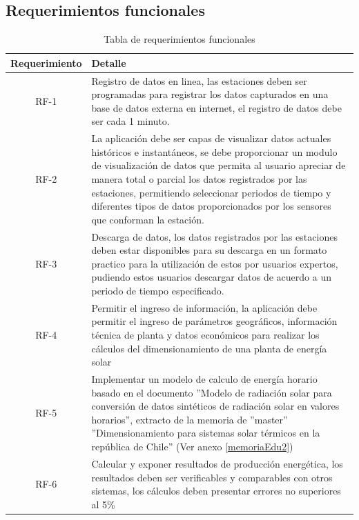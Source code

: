 \subsection{Requerimientos funcionales}
\begin{table}[h!]
\caption{Tabla de requerimientos funcionales}
\label{tablaFuncional}
\begin{tabular}{| c | p{11cm} |}
	\hline
	\textbf{Requerimiento}	&	\textbf{Detalle}	\\
	\hline
	RF-1	&	Registro de datos en linea, las estaciones deben ser programadas para registrar los datos capturados en una base de datos externa en internet, el registro de datos debe ser cada 1 minuto.	\\
	\hline
	RF-2	&	La aplicación debe ser capas de visualizar datos actuales históricos e instantáneos, se debe proporcionar un modulo de visualización de datos que permita al usuario apreciar de manera total o parcial los datos registrados por las estaciones, permitiendo seleccionar periodos de tiempo y diferentes tipos de datos proporcionados por los sensores que conforman la estación.\\
	\hline
	RF-3	&	Descarga de datos, los datos registrados por las estaciones deben estar disponibles para su descarga en un formato practico para la utilización de estos por usuarios expertos, pudiendo estos usuarios descargar datos de acuerdo a un periodo de tiempo especificado.	\\
	\hline
	RF-4	&	Permitir el ingreso de información, la aplicación debe permitir el ingreso de parámetros geográficos, información técnica de planta y datos económicos para realizar los cálculos del dimensionamiento de una planta de energía solar 	\\
	\hline
	RF-5	&	Implementar un modelo de calculo de energía horario basado en el documento ''Modelo de radiación solar para conversión de datos sintéticos de radiación solar en valores horarios'', extracto de la memoria de ''master'' ''Dimensionamiento para sistemas solar térmicos en la república de Chile\cite{memoriaEdu}'' (Ver anexo \ref{memoriaEdu2})\\
	\hline
	RF-6	&	Calcular y exponer resultados de producción energética, los resultados deben ser verificables y comparables con otros sistemas, los cálculos deben presentar errores no superiores al 5\%	\\
	\hline
\end{tabular}
\end{table}

